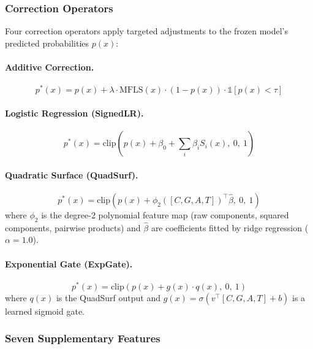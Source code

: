 \documentclass[12pt,a4paper]{article}
\begin{document}
\subsubsection{Correction Operators}

Four correction operators apply targeted adjustments to the frozen model's
predicted probabilities $p(x)$:

\paragraph{Additive Correction.}
\begin{equation}
p^*(x) = p(x) + \lambda\cdot\mathrm{MFLS}(x)\cdot(1-p(x))\cdot
\mathbb{1}[p(x)<\tau]
\end{equation}

\paragraph{Logistic Regression (SignedLR).}
\begin{equation}
p^*(x) = \mathrm{clip}\!\left(p(x)+\beta_0+\textstyle\sum_i\beta_i S_i(x),
\ 0,\ 1\right)
\end{equation}

\paragraph{Quadratic Surface (QuadSurf).}
\begin{equation}
p^*(x) = \mathrm{clip}\!\left(p(x)+\phi_2([C,G,A,T])^\top\hat{\beta},
\ 0,\ 1\right)
\end{equation}
where $\phi_2$ is the degree-2 polynomial feature map (raw components,
squared components, pairwise products) and $\hat{\beta}$ are coefficients
fitted by ridge regression ($\alpha{=}1.0$).

\paragraph{Exponential Gate (ExpGate).}
\begin{equation}
p^*(x) = \mathrm{clip}\!\left(p(x)+g(x)\cdot q(x),\ 0,\ 1\right)
\end{equation}
where $q(x)$ is the QuadSurf output and
$g(x)=\sigma(v^\top[C,G,A,T]+b)$ is a learned sigmoid gate.

\subsubsection{Seven Supplementary Features}
\end{document}
